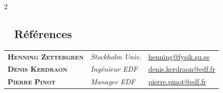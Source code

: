 \documentclass{modernsimplecv}
\newlength{\leftcolwidth}
\begin{document}
\begin{paracol}{2}
{		%

		\begin{minipage}[t]{\leftcolwidth}
			\begin{tcolorbox}[boxsep=-1mm, boxrule=0mm,colframe=shadecolor,colback=shadecolor]
				\section*{\faCheckSquareO ~ Références}
				\begin{tabular}{>{\scriptsize\bfseries\scshape}l  >{\scriptsize\it}l >{\scriptsize}l}
					Henning Zettergren & Stockholm Univ.       & \href{mailto:henning@fysik.su.se }{henning@fysik.su.se}            \\
					Denis Kerdraon       & Ingénieur EDF & \href{mailto:denis.kerdraon@edf.fr}{denis.kerdraon@edf.fr}   \\
					Pierre Pinot       & Manager EDF & \href{mailto:pierre.pinot@edf.fr}{pierre.pinot@edf.fr}   \\
				\end{tabular}
			\end{tcolorbox}
		\end{minipage}


		\vspace{-30px}\hfill

	}

	\switchcolumn
	\begin{tcolorbox}[boxsep=-1mm, boxrule=0.1mm, boxrule=0mm,colframe=shadecolor,colback=shadecolor]


\end{tcolorbox}
\end{paracol}
\end{document}
